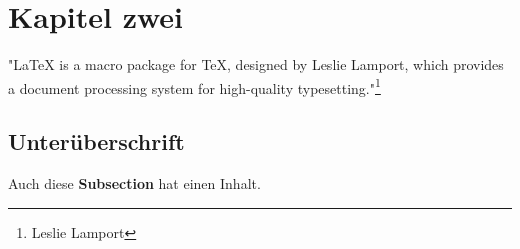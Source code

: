 \section{Kapitel zwei}

"LaTeX is a macro package for TeX, designed by Leslie Lamport, which provides a document processing system for high-quality typesetting."\footnote{Leslie Lamport}

\subsection{Unterüberschrift}

Auch diese \textbf{Subsection} hat einen Inhalt.